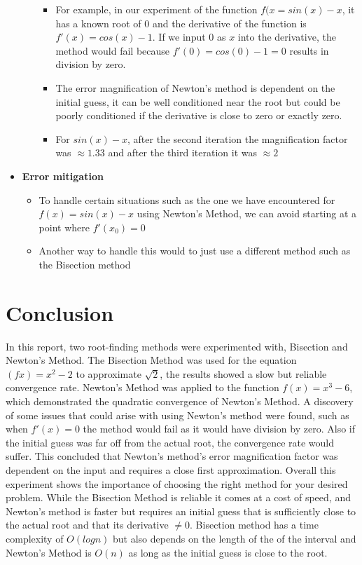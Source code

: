 \documentclass[9pt]{extarticle}
\begin{document}
\begin{itemize}
\begin{itemize}
\begin{itemize}
            \item For example, in our experiment of the function $f(x = sin(x) - x$, it has a known root of 0 and the derivative of the function is $f'(x) = cos(x) - 1$. If we input 0 as $x$ into the derivative, the method would fail because $f'(0) = cos(0) - 1 = 0$ results in division by zero.
            \item The error magnification of Newton's method is dependent on the initial guess, it can be well conditioned near the root but could be poorly conditioned if the derivative is close to zero or exactly zero.
            \item For $sin(x) - x$, after the second iteration the magnification factor was $\approx 1.33$ and after the third iteration it was $\approx 2$
        \end{itemize}
    \end{itemize}
    \item \textbf{Error mitigation}
        \begin{itemize}
            \item To handle certain situations such as the one we have encountered for $f(x) = sin(x) - x$ using Newton's Method, we can avoid starting at a point where $f'(x_0) = 0$
            \item Another way to handle this would to just use a different method such as the Bisection method
        \end{itemize}
\end{itemize}
\section{Conclusion}
 In this report, two root-finding methods were experimented with, Bisection and Newton's Method. The Bisection Method was used for the equation $(fx) = x^2 - 2$ to approximate $\sqrt{2}$, the results showed a slow but reliable convergence rate. Newton's Method was applied to the function $f(x) = x^3 - 6$, which demonstrated the quadratic convergence of Newton's Method. A discovery of some issues that could arise with using Newton's method were found, such as when $f'(x) = 0$ the method would fail as it would have division by zero. Also if the initial guess was far off from the actual root, the convergence rate would suffer. This concluded that Newton's method's error magnification factor was dependent on the input and requires a close first approximation. Overall this experiment shows the importance of choosing the right method for your desired problem. While the Bisection Method is reliable it comes at a cost of speed, and Newton's method is faster but requires an initial guess that is sufficiently close to the actual root and that its derivative $\neq 0$. Bisection method has a time complexity of $O(logn)$ but also depends on the length of the of the interval and Newton's Method is $O(n)$ as long as the initial guess is close to the root.
\end{document}
